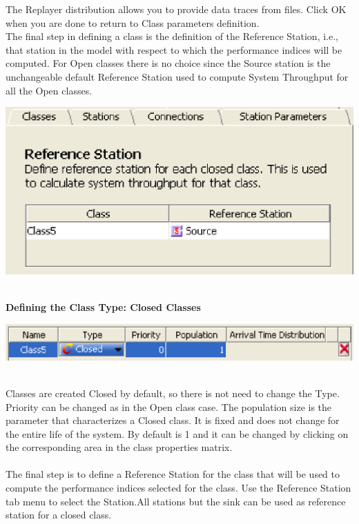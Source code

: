 The Replayer distribution allows you to provide data traces from files.
Click OK when you are done to return to Class parameters definition.\\
The final step in defining a class is the definition of the Reference Station, i.e., that station in the model with respect to which the performance indices will be computed. For Open classes there is no choice since the Source station is the unchangeable default Reference Station used to compute System Throughput for all the Open classes.\\
\begin{center}
\includegraphics[scale=.5]{img/jsim/reference_open1.eps}
\end{center}\\
\textbf{\large{Defining the Class Type: Closed Classes}}\\
\begin{center}
\includegraphics[scale=.5]{img/jsim/closed_class1.eps}
\end{center}\\
Classes are created Closed by default, so there is not need to change the Type. Priority can be changed as in the Open class case. The population size is the parameter that characterizes a Closed class. It is fixed and does not change for the entire life of the system. By default is 1 and it can be changed by clicking on the corresponding area in the class properties matrix.\\\\
The final step is to define a Reference Station for the class that will be used to compute the performance indices selected for the class. Use the Reference Station tab menu to select the Station.All stations but the sink can be used as reference station for a closed class.\\
